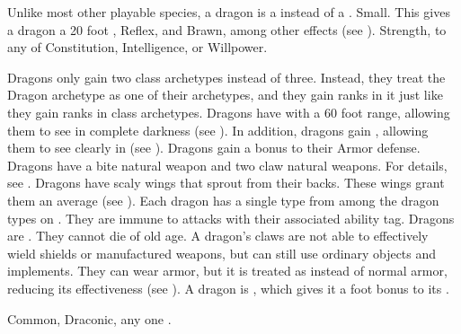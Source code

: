    Unlike most other playable species, a dragon is a  instead of a .
   Small. This gives a dragon a 20 foot ,  Reflex, and  Brawn, among other effects (see ).
    Strength,  to any of Constitution, Intelligence, or Willpower.
  \begin{raggeditemize}
     Dragons only gain two class archetypes instead of three.
      Instead, they treat the Dragon archetype as one of their archetypes, and they gain ranks in it just like they gain ranks in class archetypes.
     Dragons have  with a 60 foot range, allowing them to see in complete darkness (see ).
      In addition, dragons gain , allowing them to see clearly in  (see ).
     Dragons gain a  bonus to their Armor defense.
     Dragons have a bite natural weapon and two claw natural weapons.
      For details, see .
     Dragons have scaly wings that sprout from their backs.
      These wings grant them an average  (see ).
     Each dragon has a single type from among the dragon types on .
      They are immune to attacks with their associated ability tag.
     Dragons are .
      They cannot die of old age.
     A dragon's claws are not able to effectively wield shields or manufactured weapons, but can still use ordinary objects and implements.
      They can wear armor, but it is treated as  instead of normal armor, reducing its effectiveness (see ).
     A dragon is , which gives it a  foot bonus to its .
  \end{raggeditemize}
   Common, Draconic, any one .


